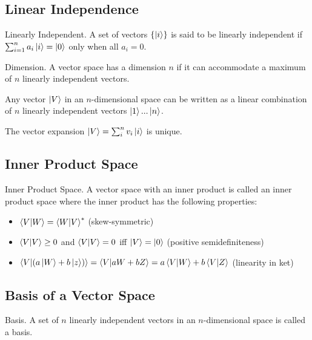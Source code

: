 \subsection{Linear Independence}
\begin{definition}{Linearly Independent.}
	A set of vectors $\{\ket{i}\}$ is said to be linearly independent if $\sum_{i=1}^{n}a_i\ket{i} = \ket{0}$ only when all $a_i=0$.
\end{definition}

\begin{definition}{Dimension.}
	A vector space has a dimension $n$ if it can accommodate a maximum of $n$ linearly independent vectors.
\end{definition}

\begin{theorem}
	Any vector $\ket{V}$ in an $n$-dimensional space can be written as a linear combination of $n$ linearly independent vectors $\ket{1}...\ket{n}$.
\end{theorem}

\begin{theorem}
	The vector expansion $\ket{V} = \sum_{i}^nv_i\ket{i}$ is unique.
\end{theorem}

\subsection{Inner Product Space}
\begin{definition}{Inner Product Space.}
	A vector space with an inner product is called an inner product space where the inner product has the following properties:
	\begin{itemize}
		\item $\braket{V}{W}=\braket{W}{V}^*$ (skew-symmetric)
		\item $\braket{V}{V} \geq 0$ and $\braket{V}{V} = 0$ iff $\ket{V}=\ket{0}$ (positive semidefiniteness)
		\item $\braket{V}{(a\ket{W} + b\ket{z})} = \braket{V}{aW + bZ} = a\braket{V}{W} + b\braket{V}{Z}$ (linearity in ket)
	\end{itemize}
\end{definition}

\subsection{Basis of a Vector Space}
\begin{definition}{Basis.}
	A set of $n$ linearly independent vectors in an $n$-dimensional space is called a basis.
\end{definition}


